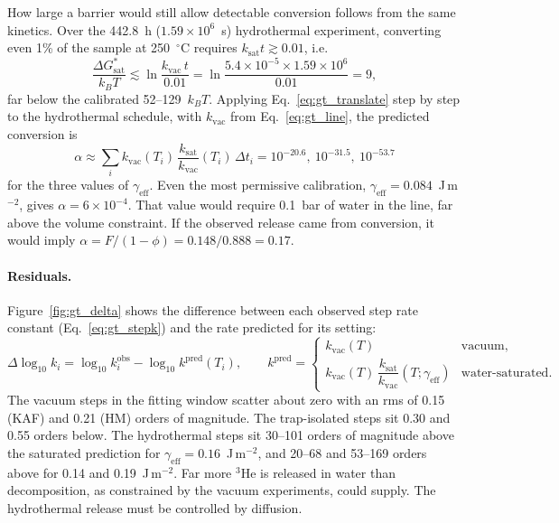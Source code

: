 How large a barrier would still allow detectable conversion follows from the same kinetics. Over
the 442.8~h ($1.59\times10^{6}$~s) hydrothermal experiment, converting even 1\% of the sample at
250~$^\circ$C requires $k_{\mathrm{sat}}t\gtrsim0.01$, i.e.
\begin{equation}
  \frac{\Delta G^{*}_{\mathrm{sat}}}{k_BT} \lesssim \ln\frac{k_{\mathrm{vac}}\,t}{0.01}
  = \ln\frac{5.4\times10^{-5}\times1.59\times10^{6}}{0.01} = 9 ,
\end{equation}
far below the calibrated 52--129~$k_BT$. Applying Eq.~\ref{eq:gt_translate} step by step to the
hydrothermal schedule, with $k_{\mathrm{vac}}$ from Eq.~\ref{eq:gt_line}, the predicted conversion is
\begin{equation}
  \alpha \approx \sum_i k_{\mathrm{vac}}(T_i)\,\frac{k_{\mathrm{sat}}}{k_{\mathrm{vac}}}(T_i)\,\Delta t_i
  = 10^{-20.6},\ 10^{-31.5},\ 10^{-53.7}
\end{equation}
for the three values of $\gamma_{\mathrm{eff}}$. Even the most permissive calibration,
$\gamma_{\mathrm{eff}} = 0.084$~J\,m$^{-2}$, gives $\alpha = 6\times10^{-4}$. That value would require
0.1~bar of water in the line, far above the volume constraint. If the observed release came from
conversion, it would imply $\alpha = F/(1-\phi) = 0.148/0.888 = 0.17$.

\paragraph{Residuals.} Figure~\ref{fig:gt_delta} shows the difference between each observed step
rate constant (Eq.~\ref{eq:gt_stepk}) and the rate predicted for its setting:
\begin{equation}
  \Delta\log_{10}k_i = \log_{10}k_i^{\mathrm{obs}} - \log_{10}k^{\mathrm{pred}}(T_i),
  \qquad
  k^{\mathrm{pred}} =
  \begin{cases}
    k_{\mathrm{vac}}(T) & \text{vacuum},\\
    k_{\mathrm{vac}}(T)\,\dfrac{k_{\mathrm{sat}}}{k_{\mathrm{vac}}}(T;\gamma_{\mathrm{eff}}) & \text{water-saturated}.
  \end{cases}
\end{equation}
The vacuum steps in the fitting window scatter about zero with an rms of 0.15 (KAF) and 0.21
(HM) orders of magnitude. The trap-isolated steps sit 0.30 and 0.55 orders below. The hydrothermal
steps sit 30--101 orders of magnitude above the saturated prediction for
$\gamma_{\mathrm{eff}}=0.16$~J\,m$^{-2}$, and 20--68 and 53--169 orders above for 0.14 and
0.19~J\,m$^{-2}$. Far more $^3$He is released in water than decomposition, as constrained by the vacuum
experiments, could supply. The hydrothermal release must be controlled by diffusion.

